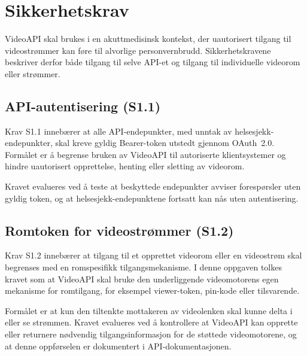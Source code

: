 \section{Sikkerhetskrav}
\label{sec:krav-sikkerhet}

VideoAPI skal brukes i en akuttmedisinsk kontekst, der uautorisert 
tilgang til videostrømmer kan føre til alvorlige personvernbrudd. 
Sikkerhetskravene beskriver derfor både tilgang til selve API-et og 
tilgang til individuelle videorom eller strømmer.

\subsection{API-autentisering (S1.1)}
\label{subsec:krav-s11}

Krav S1.1 innebærer at alle API-endepunkter, med unntak av 
helsesjekk-endepunkter, skal kreve gyldig Bearer-token utstedt 
gjennom OAuth~2.0. Formålet er å begrense bruken av VideoAPI til 
autoriserte klientsystemer og hindre uautorisert opprettelse, henting 
eller sletting av videorom.

Kravet evalueres ved å teste at beskyttede endepunkter avviser 
forespørsler uten gyldig token, og at helsesjekk-endepunktene fortsatt 
kan nås uten autentisering.

\subsection{Romtoken for videostrømmer (S1.2)}
\label{subsec:krav-s12}

Krav S1.2 innebærer at tilgang til et opprettet videorom eller en 
videostrøm skal begrenses med en romspesifikk tilgangsmekanisme. 
I denne oppgaven tolkes kravet som at VideoAPI skal bruke den 
underliggende videomotorens egen mekanisme for romtilgang, for 
eksempel viewer-token, \gls{pin}-kode eller tilsvarende.

Formålet er at kun den tiltenkte mottakeren av videolenken skal kunne 
delta i eller se strømmen. Kravet evalueres ved å kontrollere at 
VideoAPI kan opprette eller returnere nødvendig tilgangsinformasjon 
for de støttede videomotorene, og at denne oppførselen er dokumentert 
i API-dokumentasjonen.
